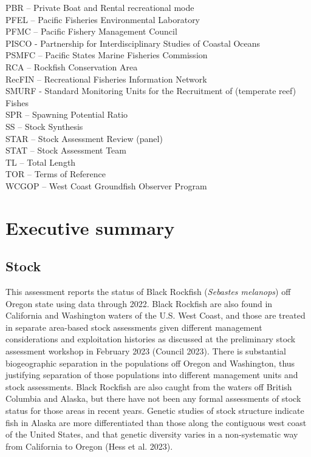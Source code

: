 \documentclass[11pt,
  english,
  letterpaper,
]{article}
\begin{document}
PBR -- Private Boat and Rental recreational mode\\
PFEL -- Pacific Fisheries Environmental Laboratory\\
PFMC -- Pacific Fishery Management Council\\
PISCO - Partnership for Interdisciplinary Studies of Coastal Oceans\\
PSMFC -- Pacific States Marine Fisheries Commission\\
RCA -- Rockfish Conservation Area\\
RecFIN -- Recreational Fisheries Information Network\\
SMURF - Standard Monitoring Units for the Recruitment of (temperate reef) Fishes\\
SPR -- Spawning Potential Ratio\\
SS -- Stock Synthesis\\
STAR -- Stock Assessment Review (panel)\\
STAT -- Stock Assessment Team\\
TL -- Total Length\\
TOR -- Terms of Reference\\
WCGOP -- West Coast Groundfish Observer Program

\newpage

\hypertarget{executive-summary}{%
\section*{Executive summary}\label{executive-summary}}

\hypertarget{stock}{%
\subsection*{Stock}\label{stock}}

This assessment reports the status of Black Rockfish (\emph{Sebastes melanops}) off Oregon state using data through 2022. Black Rockfish are also found in California and Washington waters of the U.S. West Coast, and those are treated in separate area-based stock assessments given different management considerations and exploitation histories as discussed at the preliminary stock assessment workshop in February 2023 (Council 2023). There is substantial biogeographic separation in the populations off Oregon and Washington, thus justifying separation of those populations into different management units and stock assessments. Black Rockfish are also caught from the waters off British Columbia and Alaska, but there have not been any formal assessments of stock status for those areas in recent years. Genetic studies of stock structure indicate fish in Alaska are more differentiated than those along the contiguous west coast of the United States, and that genetic diversity varies in a non-systematic way from California to Oregon (Hess et al. 2023).
\end{document}
